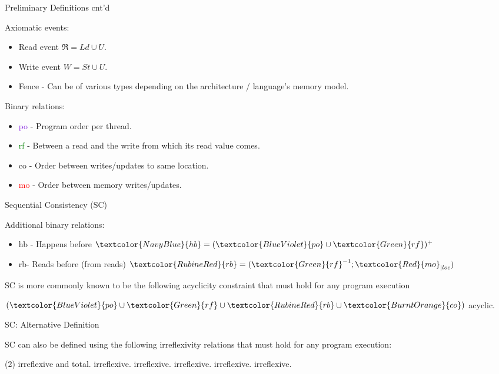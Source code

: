 \documentclass[xcolor={dvipsnames}, notes]{beamer}
\newcommand{\po}{\textcolor{BlueViolet}{po}}
\newcommand{\rf}{\textcolor{Green}{rf}}
\newcommand{\co}{\textcolor{BurntOrange}{co}}
\newcommand{\mo}{\textcolor{Red}{mo}}
\newcommand{\hb}{\textcolor{NavyBlue}{hb}}
\newcommand{\rb}{\textcolor{RubineRed}{rb}}
\begin{document}
    \begin{frame}{Preliminary Definitions cnt'd}
        
        Axiomatic events:
        \begin{itemize}
            \item Read event $\Re = Ld \cup U$.
            \item Write event $W = St \cup U$. 
            \item Fence - Can be of various types depending on the architecture / language's memory model.
        \end{itemize}

        Binary relations:
        \begin{itemize}
            \item {\po} - Program order per thread.
            \item {\rf} - Between a read and the write from which its read value comes.
            \item {\co} - Order between writes/updates to same location.
            \item {\mo} - Order between memory writes/updates.
        \end{itemize}

    \end{frame}


    \begin{frame}{Sequential Consistency (SC)}
        
        Additional binary relations:
        \begin{itemize}
            \item {\hb} - Happens before $ \hb = (\po \cup \rf)^{+} $
            \item {\rb}- Reads before (from reads) $\rb = (\rf^{-1};\mo_{|loc})$  
        \end{itemize}

        SC is more commonly known to be the following acyclicity constraint that must hold for any program execution 
        \begin{center}
            $(\po \cup \rf \cup \rb \cup \co)$ acyclic.
        \end{center}

    \end{frame}


    \begin{frame}{SC: Alternative Definition}

        SC can also be defined using the following irreflexivity relations that must hold for any program execution:
        \begin{tasks}(2)
            \task {\mo} irreflexive and total.
            \task {\hb} irreflexive.
            \task {\mo;\hb} irreflexive.
            \task {\rb;\hb} irreflexive.
            \task {\rb;\mo} irreflexive.
            \task {\rb;\mo;\hb} irreflexive.
        \end{tasks}
        
    \end{frame}
\end{document}
